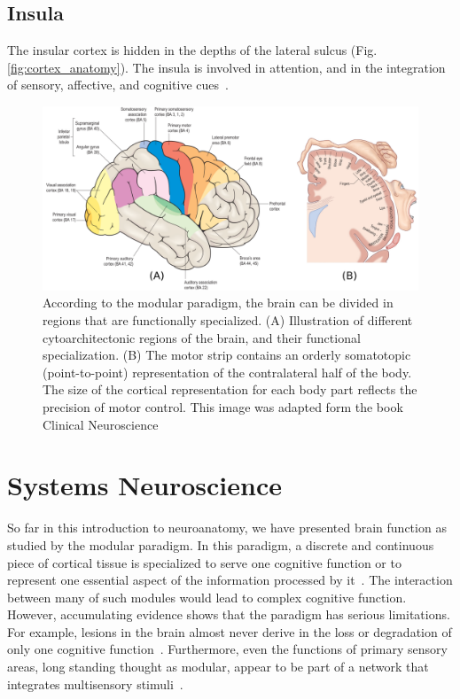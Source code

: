 \subsection{Insula}
The insular cortex is hidden in the depths of the lateral sulcus (Fig.
\ref{fig:cortex_anatomy}). The insula is involved in attention, and in the
integration of sensory, affective, and cognitive cues~\cite{Bressler2010, Johns}.

\begin{figure}[t]
    \includegraphics[width=\textwidth]{2.neuroanatomy/img/function.png}
    \caption{According to the modular paradigm, the brain can be divided in
             regions that are functionally specialized. (A) Illustration of
             different cytoarchitectonic regions of the brain, and their
             functional specialization. (B) The motor strip contains an
             orderly somatotopic (point-to-point) representation of the
             contralateral half of the body. The size of the cortical
             representation for each body part reflects the precision of
             motor control. This image was adapted form the book Clinical
             Neuroscience\cite{Johns}}
    \label{fig:brain_function}
\end{figure}


\section{Systems Neuroscience}
So far in this introduction to neuroanatomy, we have presented brain function
as studied by the modular paradigm.
In this paradigm, a discrete and continuous piece of cortical tissue is specialized
to serve one cognitive function or to represent one essential aspect of the
information processed by it~\cite{Fuster2000}. The interaction between many
of such modules would lead to complex cognitive function. However, accumulating
evidence shows that the paradigm has serious limitations. For example, lesions
in the brain almost never derive in the loss or degradation of only one cognitive
function~\cite{Fuster2000}. Furthermore, even the functions of primary sensory
areas, long standing thought as modular, appear to be part of a network that
integrates multisensory stimuli~\cite{Ghazanfar2006}.

